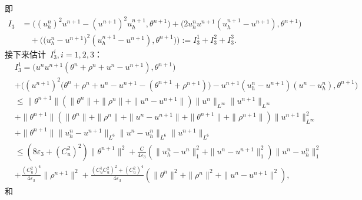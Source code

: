 \documentclass[twoside,UTF8]{nputhesis}
\begin{document}
即
\begin{equation}
\begin{split}
I_3&=\Big((u^n_h)^2u^{n+1}-(u^{n+1})^2u^{n+1}_h,\theta^{n+1}\Big)+\Big(2u^n_hu^{n+1}(u^{n+1}_h-u^{n+1}),\theta^{n+1}\Big)\\
&\quad+\Big(\big(u^n_h-u^{n+1})^2(u^{n+1}_h-u^{n+1}),\theta^{n+1}\big)\Big):=I_3^1+I_3^2+I_3^3.
\end{split}
\end{equation}
接下来估计~$I_3^i,i=1,2,3$：
\begin{equation}
\begin{split}
&I_3^1=\Big(u^nu^{n+1}(\theta^n+\rho^n+u^n-u^{n+1}),\theta^{n+1}\Big)\\
&+\Big((u^{n+1})^2\big(\theta^n\!+\!\rho^n\!+\!u^n\!-\!u^{n+1}\!-\!(\theta^{n+1}\!+\!\rho^{n+1})\big)\!-\!u^{n+1}(u^n_h\!-\!u^{n+1})(u^n\!-\!u^n_h),
\theta^{n+1}\Big)\\
&\leq\parallel \theta^{n+1}\parallel(\parallel \theta^n\parallel+\| \rho^n\|+\| u^n-u^{n+1}\|)\| u^n\|_{L^\infty}\| u^{n+1}\|_{L^\infty}\\
&+\parallel \theta^{n+1}\parallel(\parallel \theta^n\parallel+\parallel \rho^n\parallel+\parallel u^n-u^{n+1}\parallel+\parallel \theta^{n+1}\parallel+\parallel \rho^{n+1}\parallel)\parallel u^{n+1}\parallel^2_{L^\infty}\\
&+\parallel \theta^{n+1}\parallel\parallel u^n_h-u^{n+1}\parallel_{L^6}\parallel u^n-u^n_h\parallel_{L^6}\parallel u^{n+1}\parallel_{L^6}\\
&\leq(8\varepsilon_3+(C_u^2)^2)\parallel \theta^{n+1}\parallel^2
+\frac{C}{4\varepsilon_3}(\parallel u^n_h-u^{n}\parallel^2_1+\parallel u^n-u^{n+1}\parallel^2_1)\parallel u^n-u^n_h\parallel^2_1\\
&+\frac{(C_u^2)^4}{4\varepsilon_3}\parallel \rho^{n+1}\parallel^2
+\frac{(C^1_uC^2_u)^2+(C^2_u)^4}{4\varepsilon_3}(\parallel\theta^n\parallel^2+\parallel \rho^n\parallel^2+\parallel u^n-u^{n+1}\parallel^2),
\label{75}
\end{split}
\end{equation}
和
\end{document}
